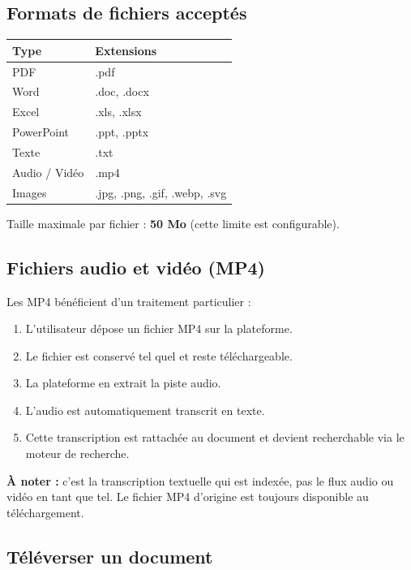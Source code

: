 \documentclass[a4paper,12pt,french]{article}
\begin{document}
\subsection{Formats de fichiers acceptés}

\begin{tabularx}{\textwidth}{l l}
\toprule
\textbf{Type} & \textbf{Extensions} \\
\midrule
PDF & .pdf \\
Word & .doc, .docx \\
Excel & .xls, .xlsx \\
PowerPoint & .ppt, .pptx \\
Texte & .txt \\
Audio / Vidéo & .mp4 \\
Images & .jpg, .png, .gif, .webp, .svg \\
\bottomrule
\end{tabularx}

\vspace{0.5em}
Taille maximale par fichier : \textbf{50 Mo} (cette limite est configurable).

\subsection{Fichiers audio et vidéo (MP4)}

Les MP4 bénéficient d'un traitement particulier :

\begin{enumerate}[leftmargin=1.5em]
  \item L'utilisateur dépose un fichier MP4 sur la plateforme.
  \item Le fichier est conservé tel quel et reste téléchargeable.
  \item La plateforme en extrait la piste audio.
  \item L'audio est automatiquement transcrit en texte.
  \item Cette transcription est rattachée au document et devient recherchable via le moteur de recherche.
\end{enumerate}

\textbf{À noter :} c'est la transcription textuelle qui est indexée, pas le flux audio ou vidéo en tant que tel. Le fichier MP4 d'origine est toujours disponible au téléchargement.

\subsection{Téléverser un document}
\end{document}
